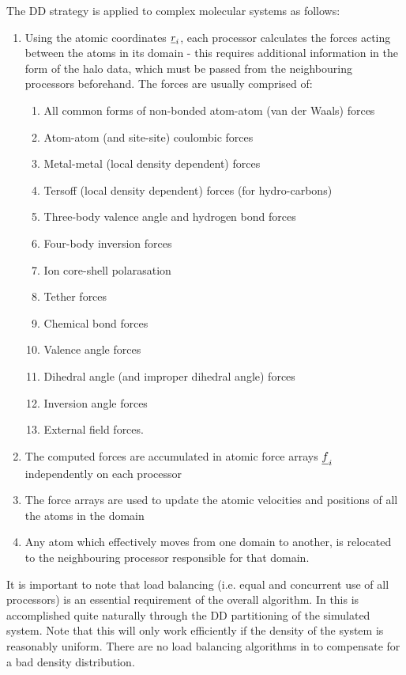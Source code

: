 The DD strategy is applied to complex molecular systems as follows:
\begin{enumerate}
\item Using the atomic coordinates $\mbox{$\underline{r}$}_{i}$, each processor
calculates the forces acting between the atoms in its domain -
this requires additional information in the form of the halo data,
which must be passed from the neighbouring processors beforehand.
The forces are usually comprised of:
\begin{enumerate}
\item All common forms of non-bonded atom-atom (van der Waals) forces
\item Atom-atom (and site-site) coulombic forces
\item Metal-metal (local density dependent) forces
\item Tersoff (local density dependent) forces (for hydro-carbons) \cite{tersoff-89a}
\item Three-body valence angle and hydrogen bond forces
\item Four-body inversion forces
\item Ion core-shell polarasation
\item Tether forces
\item Chemical bond forces
\item Valence angle forces
\item Dihedral angle (and improper dihedral angle) forces
\item Inversion angle forces
\item External field forces.
\end{enumerate}
\item The computed forces are accumulated in atomic
force arrays $\mbox{$\underline{f}$}_{i}$ independently on each processor
\item The force arrays are used to update the atomic
velocities and positions  of all the atoms in the domain
\item Any atom which effectively moves from one domain to another, is
relocated to the neighbouring processor responsible for that domain.
\end{enumerate}
It is important to note that load balancing (i.e. equal and
concurrent use of all processors) is an essential requirement of
the overall algorithm.  In \D this is accomplished quite naturally
through the DD partitioning of the simulated system.  Note that
this will only work efficiently if the density of the system is
reasonably uniform.  {\sc There are no load balancing algorithms
in \D to compensate for a bad density distribution.}

